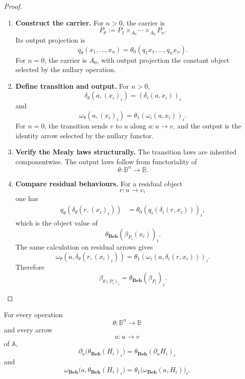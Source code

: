 \begin{proof}
    \leavevmode
    \begin{enumerate}
        \item \textbf{Construct the carrier.}
        For \(n>0\), the carrier is
        \[
            P_\theta:=P_1\times_{A_0}\cdots\times_{A_0}P_n.
        \]
        Its output projection is
        \[
            q_\theta(x_1,\dots,x_n)
            =
            \theta_0(q_1x_1,\dots,q_nx_n).
        \]
        For \(n=0\), the carrier is \(A_0\), with output projection the
        constant object selected by the nullary operation.

        \item \textbf{Define transition and output.}
        For \(n>0\),
        \[
            \delta_\theta(a,(x_i)_i)
            =
            (\delta_i(a,x_i))_i
        \]
        and
        \[
            \omega_\theta(a,(x_i)_i)
            =
            \theta_1(\omega_i(a,x_i))_i.
        \]
        For \(n=0\), the transition sends \(v\) to \(u\) along
        \(a:u\to v\), and the output is the identity arrow selected by the
        nullary functor.

        \item \textbf{Verify the Mealy laws structurally.}
        The transition laws are inherited componentwise. The output laws follow
        from functoriality of
        \[
            \theta:\mathbb B^n\to\mathbb B.
        \]

        \item \textbf{Compare residual behaviours.}
        For a residual object
        \[
            r:u\to v,
        \]
        one has
        \[
        \begin{aligned}
            q_\theta(\delta_\theta(r,(x_i)_i))
            &=
            \theta_0(q_i(\delta_i(r,x_i)))_i,
        \end{aligned}
        \]
        which is the object value of
        \[
            \theta_{\mathbf{Beh}}(\beta_{P_i}(x_i))_i.
        \]
        The same calculation on residual arrows gives
        \[
            \omega_\theta(a,\delta_\theta(r,(x_i)_i))
            =
            \theta_1(\omega_i(a,\delta_i(r,x_i)))_i.
        \]
        Therefore
        \[
            \beta_{\theta(P_i)_i}
            =
            \theta_{\mathbf{Beh}}(\beta_{P_i})_i.
        \]
    \end{enumerate}
\end{proof}

\begin{lemma}
\label{lem:operations-preserve-derivatives-output}
    For every operation
    \[
        \theta:\mathbb B^n\to\mathbb B
    \]
    and every arrow
    \[
        a:u\to v
    \]
    of \(\mathbb A\),
    \[
        \partial_a\bigl(\theta_{\mathbf{Beh}}(H_i)_i\bigr)
        =
        \theta_{\mathbf{Beh}}(\partial_aH_i)_i
    \]
    and
    \[
        \omega_{\mathbf{Beh}}
        \bigl(a,\theta_{\mathbf{Beh}}(H_i)_i\bigr)
        =
        \theta_1\bigl(\omega_{\mathbf{Beh}}(a,H_i)\bigr)_i.
    \]
\end{lemma}

